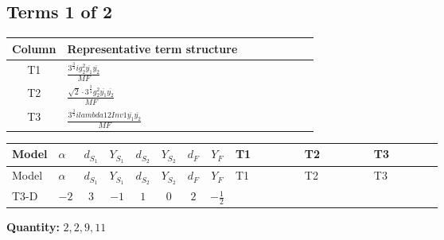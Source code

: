 \documentclass[8pt]{article}
\begin{document}
\begin{landscape}
\subsection*{Terms 1 of 2}
\begin{center}
\begin{tabular}{@{}c >{\raggedright\arraybackslash}p{0.82\linewidth}@{}}
\toprule
Column & Representative term structure \\
\midrule
T1 & \(\displaystyle \frac{3^{\frac{3}{4}} i g_{2}^{2} \overline{y_{1}} \overline{y_{2}}}{MF}\) \\
\midrule
T2 & \(\displaystyle \frac{\sqrt{2} \cdot 3^{\frac{3}{4}} g_{2}^{2} \overline{y_{1}} \overline{y_{2}}}{MF}\) \\
\midrule
T3 & \(\displaystyle \frac{3^{\frac{3}{4}} i lambda12Inv1 \overline{y_{1}} \overline{y_{2}}}{MF}\) \\
\midrule
\bottomrule
\end{tabular}
\end{center}
\smallskip
\tiny
\begin{longtable}{@{}llcccccc >{\raggedright\arraybackslash}p{0.21\linewidth} >{\raggedright\arraybackslash}p{0.21\linewidth} >{\raggedright\arraybackslash}p{0.21\linewidth}@{}}
\toprule
Model & $\alpha$ & $d_{S_1}$ & $Y_{S_1}$ & $d_{S_2}$ & $Y_{S_2}$ & $d_F$ & $Y_F$ & T1 & T2 & T3 \\
\midrule
\endfirsthead
\toprule
Model & $\alpha$ & $d_{S_1}$ & $Y_{S_1}$ & $d_{S_2}$ & $Y_{S_2}$ & $d_F$ & $Y_F$ & T1 & T2 & T3 \\
\midrule
\endhead
T3-D & $-2$ & $3$ & $-1$ & $1$ & $0$ & $2$ & $-\frac{1}{2}$ & \scriptsize\adjustbox{max width=\linewidth}{$\begin{gathered} - \frac{17 \cdot 3^{\frac{3}{4}} i g_{2}^{2} \overline{y_{1}} \overline{y_{2}}}{24 MF}\end{gathered}$} & \scriptsize\adjustbox{max width=\linewidth}{$\begin{gathered} - \frac{\sqrt{2} \cdot 3^{\frac{3}{4}} g_{2}^{2} \overline{y_{1}} \overline{y_{2}}}{3 MF}\end{gathered}$} & \scriptsize\adjustbox{max width=\linewidth}{$\begin{gathered} - \frac{3^{\frac{3}{4}} i lambda12Inv1 \overline{y_{1}} \overline{y_{2}}}{6 MF}\end{gathered}$} \\
\midrule
\bottomrule
\end{longtable}
\clearpage
\noindent\textbf{Quantity: }$\mathrm{2,2,9,11}$\par\smallskip

\end{landscape}
\end{document}
